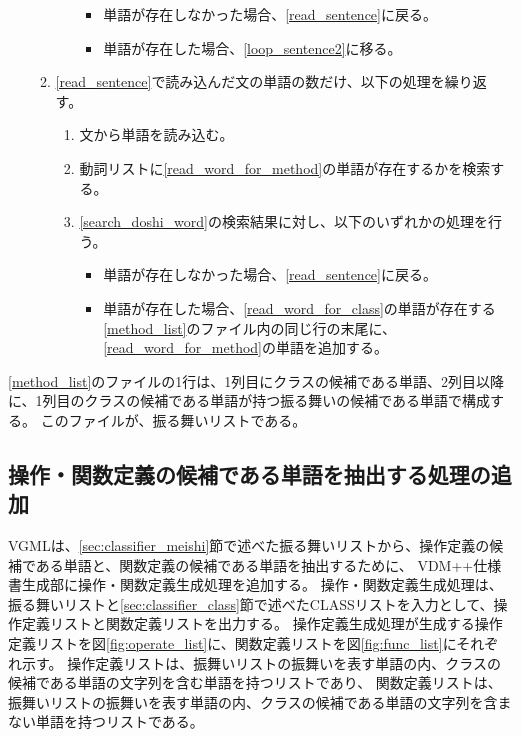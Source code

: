 \begin{enumerate}
\begin{enumerate}
\begin{enumerate}
\begin{itemize}
                            \item 単語が存在しなかった場合、\ref{read_sentence}に戻る。
                            \item 単語が存在した場合、\ref{loop_sentence2}に移る。
                        \end{itemize}
                \end{enumerate}
            \item \ref{read_sentence}で読み込んだ文の単語の数だけ、以下の処理を繰り返す。
            \label{loop_sentence2}
                \begin{enumerate}
                    \item 文から単語を読み込む。
                    \label{read_word_for_method}
                    \item 動詞リストに\ref{read_word_for_method}の単語が存在するかを検索する。
                    \label{search_doshi_word}
                    \item \ref{search_doshi_word}の検索結果に対し、以下のいずれかの処理を行う。
                        \begin{itemize}
                            \item 単語が存在しなかった場合、\ref{read_sentence}に戻る。
                            \item 単語が存在した場合、\ref{read_word_for_class}の単語が存在する\ref{method_list}のファイル内の同じ行の末尾に、\ref{read_word_for_method}の単語を追加する。
                        \end{itemize}
                \end{enumerate}
        \end{enumerate}
\end{enumerate}

\ref{method_list}のファイルの1行は、1列目にクラスの候補である単語、2列目以降に、1列目のクラスの候補である単語が持つ振る舞いの候補である単語で構成する。
このファイルが、振る舞いリストである。

\subsection{操作・関数定義の候補である単語を抽出する処理の追加}
\label{sec:operate_generator}
VGMLは、\ref{sec:classifier_meishi}節で述べた振る舞いリストから、操作定義の候補である単語と、関数定義の候補である単語を抽出するために、
VDM++仕様書生成部に操作・関数定義生成処理を追加する。
操作・関数定義生成処理は、振る舞いリストと\ref{sec:classifier_class}節で述べたCLASSリストを入力として、操作定義リストと関数定義リストを出力する。
操作定義生成処理が生成する操作定義リストを図\ref{fig:operate_list}に、関数定義リストを図\ref{fig:func_list}にそれぞれ示す。
操作定義リストは、振舞いリストの振舞いを表す単語の内、クラスの候補である単語の文字列を含む単語を持つリストであり、
関数定義リストは、振舞いリストの振舞いを表す単語の内、クラスの候補である単語の文字列を含まない単語を持つリストである。

